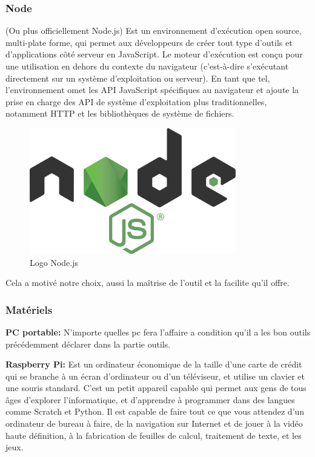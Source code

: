 \documentclass[12pt]{article}
\begin{document}
\subsubsection*{Node}
(Ou plus officiellement Node.js) Est un environnement d'exécution open source, multi-plate forme, qui permet aux développeurs de créer tout type d'outils et d'applications côté serveur en JavaScript. Le moteur d’exécution est conçu pour une utilisation en dehors du contexte du navigateur (c’est-à-dire s’exécutant directement sur un système d’exploitation ou serveur). En tant que tel, l'environnement omet les API JavaScript spécifiques au navigateur et ajoute la prise en charge des API de système d'exploitation plus traditionnelles, notamment HTTP et les bibliothèques de système de fichiers.

\begin{figure}[h]
	\centering
	\includegraphics[width=9cm]{img-Chapiter-4/nodejs.png}
	\caption{Logo Node.js}
\end{figure}

Cela a motivé notre choix, aussi la maîtrise de l’outil et la facilite qu'il offre.
\subsubsection{Matériels}
\textbf{PC portable:} N’importe quelles pc fera l’affaire a condition qu’il a les bon outils précédemment déclarer dans la partie outils.

\textbf{Raspberry Pi:} Est un ordinateur économique de la taille d’une carte de crédit qui se branche à un écran d’ordinateur ou d’un téléviseur, et utilise un clavier et une souris standard. C’est un petit appareil capable qui permet aux gens de tous âges d’explorer l’informatique, et d’apprendre à programmer dans des langues comme Scratch et Python. Il est capable de faire tout ce que vous attendez d’un ordinateur de bureau à faire, de la navigation sur Internet et de jouer à la vidéo haute définition, à la fabrication de feuilles de calcul, traitement de texte, et les jeux.
\end{document}
